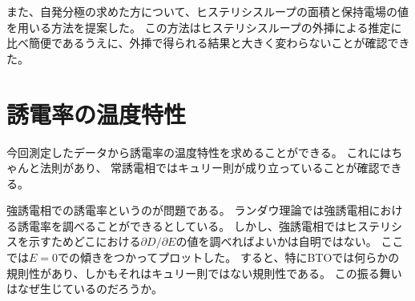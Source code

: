 \documentclass[9pt,dvipdfmx,a4paper]{jsarticle}
\begin{document}
また、自発分極の求めた方について、ヒステリシスループの面積と保持電場の値を用いる方法を提案した。
この方法はヒステリシスループの外挿による推定に比べ簡便であるうえに、外挿で得られる結果と大きく変わらないことが確認できた。




\nocite{*}

\appendix
\section{誘電率の温度特性}
今回測定したデータから誘電率の温度特性を求めることができる。
これにはちゃんと法則があり、
常誘電相ではキュリー則が成り立っていることが確認できる。

強誘電相での誘電率というのが問題である。
ランダウ理論では強誘電相における誘電率を調べることができるとしている。
しかし、強誘電相ではヒステリシスを示すためどこにおける\(\partial D /\partial E\)の値を調べればよいかは自明ではない。
ここでは\(E=0\)での傾きをつかってプロットした。
すると、特にBTOでは何らかの規則性があり、しかもそれはキュリー則ではない規則性である。
この振る舞いはなぜ生じているのだろうか。
\end{document}
